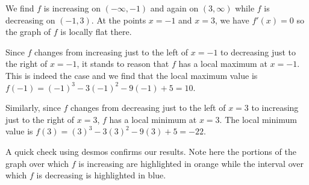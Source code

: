 \documentclass{ximera}
\begin{document}
\begin{example}
\begin{explanation}
\begin{image}
\end{image}



We find $f$ is increasing on $(-\infty, -1)$ and again on $(3, \infty)$ while  $f$ is decreasing on $(-1,3)$.  At the points $x = -1$ and $x=3$, we have $f'(x) = 0$ so the graph of $f$ is locally flat there.  



Since $f$ changes from increasing just to the left of $x=-1$ to decreasing just to the right of $x=-1$, it stands to reason that $f$ has a local maximum at $x=-1$.  This is indeed the case and we find that the local maximum value is  $f(-1) = (-1)^3 - 3(-1)^2 - 9(-1)+5 = 10$.

Similarly, since $f$ changes from decreasing just to the left of $x=3$ to increasing just to the right of $x=3$, $f$ has a local minimum at $x=3$.  The local minimum value is $f(3) = (3)^3 - 3(3)^2 - 9(3)+5 = -22$.

A quick check using desmos confirms our results.  Note here the portions of the graph over which $f$ is increasing are highlighted in orange while the interval over which $f$ is decreasing is highlighted in blue.

\begin{center}
\end{center}

\end{explanation}

\end{example}
\end{document}
